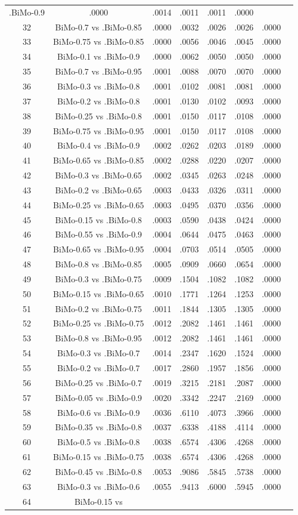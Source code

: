 \documentclass[a4paper,10pt]{article}
\begin{document}
\begin{landscape}
\begin{table}[!htp]
\begin{tabular}{cccccccc}
.BiMo-0.9&.0000&.0014&.0011&.0011&.0000\\32&BiMo-0.7 vs .BiMo-0.85&.0000&.0032&.0026&.0026&.0000\\33&BiMo-0.75 vs .BiMo-0.85&.0000&.0056&.0046&.0045&.0000\\34&BiMo-0.1 vs .BiMo-0.9&.0000&.0062&.0050&.0050&.0000\\35&BiMo-0.7 vs .BiMo-0.95&.0001&.0088&.0070&.0070&.0000\\36&BiMo-0.3 vs .BiMo-0.8&.0001&.0102&.0081&.0081&.0000\\37&BiMo-0.2 vs .BiMo-0.8&.0001&.0130&.0102&.0093&.0000\\38&BiMo-0.25 vs .BiMo-0.8&.0001&.0150&.0117&.0108&.0000\\39&BiMo-0.75 vs .BiMo-0.95&.0001&.0150&.0117&.0108&.0000\\40&BiMo-0.4 vs .BiMo-0.9&.0002&.0262&.0203&.0189&.0000\\41&BiMo-0.65 vs .BiMo-0.85&.0002&.0288&.0220&.0207&.0000\\42&BiMo-0.3 vs .BiMo-0.65&.0002&.0345&.0263&.0248&.0000\\43&BiMo-0.2 vs .BiMo-0.65&.0003&.0433&.0326&.0311&.0000\\44&BiMo-0.25 vs .BiMo-0.65&.0003&.0495&.0370&.0356&.0000\\45&BiMo-0.15 vs .BiMo-0.8&.0003&.0590&.0438&.0424&.0000\\46&BiMo-0.55 vs .BiMo-0.9&.0004&.0644&.0475&.0463&.0000\\47&BiMo-0.65 vs .BiMo-0.95&.0004&.0703&.0514&.0505&.0000\\48&BiMo-0.8 vs .BiMo-0.85&.0005&.0909&.0660&.0654&.0000\\49&BiMo-0.3 vs .BiMo-0.75&.0009&.1504&.1082&.1082&.0000\\50&BiMo-0.15 vs .BiMo-0.65&.0010&.1771&.1264&.1253&.0000\\51&BiMo-0.2 vs .BiMo-0.75&.0011&.1844&.1305&.1305&.0000\\52&BiMo-0.25 vs .BiMo-0.75&.0012&.2082&.1461&.1461&.0000\\53&BiMo-0.8 vs .BiMo-0.95&.0012&.2082&.1461&.1461&.0000\\54&BiMo-0.3 vs .BiMo-0.7&.0014&.2347&.1620&.1524&.0000\\55&BiMo-0.2 vs .BiMo-0.7&.0017&.2860&.1957&.1856&.0000\\56&BiMo-0.25 vs .BiMo-0.7&.0019&.3215&.2181&.2087&.0000\\57&BiMo-0.05 vs .BiMo-0.9&.0020&.3342&.2247&.2169&.0000\\58&BiMo-0.6 vs .BiMo-0.9&.0036&.6110&.4073&.3966&.0000\\59&BiMo-0.35 vs .BiMo-0.8&.0037&.6338&.4188&.4114&.0000\\60&BiMo-0.5 vs .BiMo-0.8&.0038&.6574&.4306&.4268&.0000\\61&BiMo-0.15 vs .BiMo-0.75&.0038&.6574&.4306&.4268&.0000\\62&BiMo-0.45 vs .BiMo-0.8&.0053&.9086&.5845&.5738&.0000\\63&BiMo-0.3 vs .BiMo-0.6&.0055&.9413&.6000&.5945&.0000\\64&BiMo-0.15 vs 
\end{tabular}
\end{table}
\end{landscape}
\end{document}
